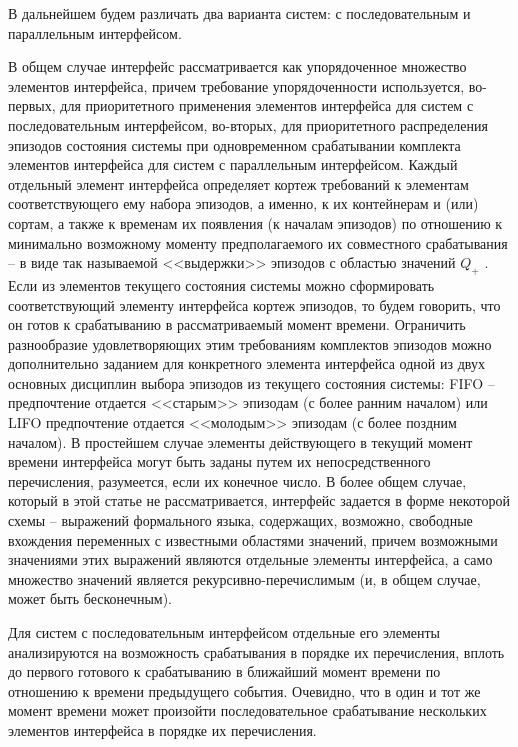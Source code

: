 В дальнейшем будем различать два варианта систем: с последовательным и параллельным интерфейсом.

В общем случае интерфейс рассматривается как упорядоченное множество элементов интерфейса, причем требование упорядоченности используется, во-первых, для приоритетного применения элементов интерфейса для систем с последовательным интерфейсом, во-вторых, для приоритетного распределения эпизодов состояния системы при одновременном срабатывании комплекта элементов интерфейса для систем с параллельным интерфейсом.
Каждый отдельный элемент интерфейса определяет кортеж требований к элементам соответствующего ему набора эпизодов, а именно, к их контейнерам и (или) сортам, а также к временам их появления (к началам эпизодов) по отношению к минимально возможному моменту предполагаемого их совместного срабатывания – в виде так называемой <<выдержки>> эпизодов с областью значений $ Q_+ $ . 
Если из элементов текущего состояния системы можно сформировать соответствующий элементу интерфейса кортеж эпизодов, то будем говорить, что он готов к срабатыванию в рассматриваемый момент времени. 
Ограничить разнообразие удовлетворяющих этим требованиям комплектов эпизодов можно дополнительно заданием для конкретного элемента интерфейса одной из двух основных дисциплин выбора эпизодов из текущего состояния системы: FIFO – предпочтение отдается <<старым>> эпизодам (с более ранним началом) или LIFO  предпочтение отдается <<молодым>> эпизодам (с более поздним началом). 
В простейшем случае элементы действующего в текущий момент времени интерфейса могут быть заданы путем их непосредственного перечисления, разумеется, если их конечное число. 
В более общем случае, который в этой статье не рассматривается, интерфейс задается в форме некоторой схемы – выражений формального языка, содержащих, возможно, свободные вхождения переменных с известными областями значений, причем возможными значениями этих выражений являются отдельные элементы интерфейса, а само множество значений является рекурсивно-перечислимым (и, в общем случае, может быть бесконечным). 

Для систем с последовательным интерфейсом отдельные его элементы анализируются на возможность срабатывания в порядке их перечисления, вплоть до первого готового к срабатыванию в ближайший момент времени по отношению к времени предыдущего события. Очевидно, что в один и тот же момент времени может произойти последовательное срабатывание нескольких элементов интерфейса в порядке их перечисления.

